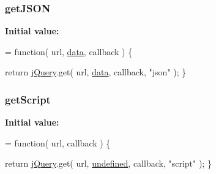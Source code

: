 \subsubsection[{get\+J\+S\+O\+N}]{ get\+J\+S\+O\+N}\label{jquery-1_810_82-vsdoc_8js_a27b6f13a844bac0871a73628443197b5}
{\bfseries Initial value\+:}
\begin{DoxyCode}
= \textcolor{keyword}{function}( url, \hyperlink{jquery-1_810_82-vsdoc_8js_a609407b3456fdc3c5671a9fc4a226ff7}{data}, callback ) \{


        \textcolor{keywordflow}{return} \hyperlink{jquery-1_810_82-vsdoc_8js_add5237586d970a38a81f990e8eb28c6c}{jQuery}.get( url, \hyperlink{jquery-1_810_82-vsdoc_8js_a609407b3456fdc3c5671a9fc4a226ff7}{data}, callback, \textcolor{stringliteral}{"json"} );
    \}
\end{DoxyCode}
\hypertarget{jquery-1_810_82-vsdoc_8js_abbf3713d0b4ae50a921583a6932e4c71}{}
\subsubsection[{get\+Script}]{ get\+Script}\label{jquery-1_810_82-vsdoc_8js_abbf3713d0b4ae50a921583a6932e4c71}
{\bfseries Initial value\+:}
\begin{DoxyCode}
= \textcolor{keyword}{function}( url, callback ) \{


        \textcolor{keywordflow}{return} \hyperlink{jquery-1_810_82-vsdoc_8js_add5237586d970a38a81f990e8eb28c6c}{jQuery}.get( url, \hyperlink{jquery-1_810_82-vsdoc_8js_a08113a236cc18d2a9d5ce27e638012be}{undefined}, callback, \textcolor{stringliteral}{"script"} );
    \}
\end{DoxyCode}
\hypertarget{jquery-1_810_82-vsdoc_8js_a898e1e411825feebc0c78978f2a2a140}{}
